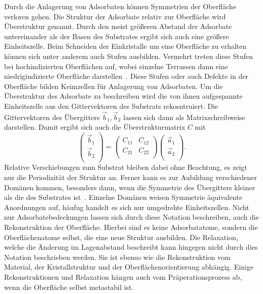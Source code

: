         Durch die Anlagerung von Adsorbaten können Symmetrien der Oberfläche verloren gehen.
        Die Struktur der Adsorbate relativ zur Oberfläche wird Überstruktur genannt.
        Durch den meist größeren Abstand der Adsorbate untereinander als der Basen des Substrates ergibt sich auch eine größere Einheitszelle.
        Beim Schneiden der Einkristalle um eine Oberfläche zu erhalten können sich unter anderem auch Stufen ausbilden.
        Vermehrt treten diese Stufen bei hochindizierten Oberflächen auf, wobei einzelne Terrassen dann eine niedrigindizierte Oberfläche darstellen~\cite{Fauster}.
        Diese Stufen oder auch Defekte in der Oberfläche bilden Keimzellen für Anlagerung von Adsorbaten.
        Um die Überstruktur des Adsorbate zu beschreiben wird die von ihnen aufgespannte Einheitszelle aus den Gittervektoren des Substrats rekosntruiert.
        Die Gittervektoren des Übergitters $\vec{b}_1, \vec{b}_2$ lassen sich dann als Matrixschreibweise darstellen.
        Damit ergibt sich auch die Überstrukturmatrix $C$ mit 
        \begin{equation}
            \begin{pmatrix}
                \vec{b}_1 \\
                \vec{b}_2 \\
            \end{pmatrix}
            = 
            \begin{pmatrix}
                C_{11} & C_{12} \\
                C_{21} & C_{22} \\
            \end{pmatrix}
            \begin{pmatrix}
                \vec{a}_1 \\
                \vec{a}_2 \\
            \end{pmatrix}.
        \end{equation}
        Relative Verschiebungen zum Substrat bleiben dabei ohne Beachtung, es zeigt nur die Periodizität der Struktur an.
        Ferner kann es zur Aubildung verschiedener Domänen kommen, besonders dann, wenn die Symmetrie des Übergitters kleiner als die des Substrates ist~\cite{Fauster}.
        Einzelne Domänen weisen Symmetrie äquivalente Anordnungen auf, häufug handelt es sich nur umgedrehte Einheitszellen.
        Nicht nur Adsorbatebedeckungen lassen sich durch diese Notation beschreiben, auch die Rekonstruktion der Oberfläche.
        Hierbei sind es keine Adsorbatatome, sondern die Oberflächenatome selbst, die eine neue Struktur ausbilden.
        Die Relaxation, welche die Änderung im Lagenabstand beschreibt kann hingegen nicht durch dies Notation beschrieben werden.
        Sie ist ebenso wie die Rekonstruktion vom Material, der Kristallstruktur und der Oberflächenorientierung abhängig.
        Einige Rekonstruktionen und Relaxation hängen auch vom Präperationsprozess ab, wenn die Oberfläche selbst metastabil ist.
    
